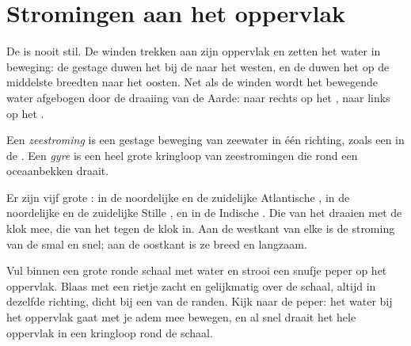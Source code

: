 \section{Stromingen aan het oppervlak}

De  is nooit stil. De winden trekken aan zijn oppervlak en zetten
het water in beweging: de gestage  duwen het bij de 
naar het westen, en de  duwen het op de middelste breedten naar
het oosten. Net als de winden wordt het bewegende water afgebogen door de
draaiing van de Aarde: naar rechts op het , naar links
op het .

\begin{definition}\label{def:g8:the-oceans:current}
Een \emph{zeestroming} is een gestage beweging van
zeewater in één richting, zoals een  in de . Een
\emph{gyre} is een heel grote kringloop van zeestromingen die
rond een oceaanbekken draait.
\end{definition}
\label{def:g8:the-oceans:gyre}

Er zijn vijf grote : in de noordelijke en de zuidelijke Atlantische
, in de noordelijke en de zuidelijke Stille , en in de
Indische . Die van het  draaien met de klok mee,
die van het  tegen de klok in. Aan de westkant van elke
 is de stroming van de  smal en snel; aan de oostkant is ze
breed en langzaam.

\begin{inthelab}
Vul binnen een grote ronde schaal met water en strooi een snufje peper op
het oppervlak. Blaas met een rietje zacht en gelijkmatig over de schaal,
altijd in dezelfde richting, dicht bij een van de randen. Kijk naar de
peper: het water bij het oppervlak gaat met je adem mee bewegen, en al snel
draait het hele oppervlak in een kringloop rond de schaal.
\end{inthelab}

